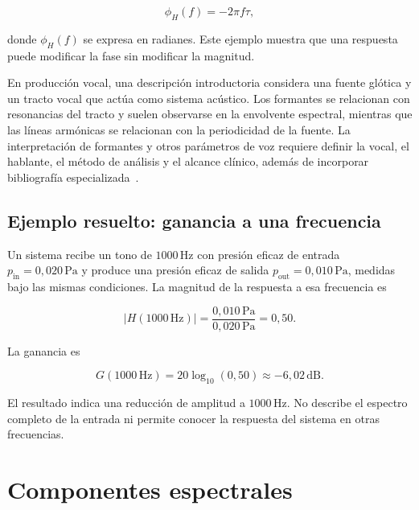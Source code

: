 \begin{equation}
    \phi_H(f)=-2\pi f\tau,
    \label{eq:u5-fase-retardo}
\end{equation}

donde \(\phi_H(f)\) se expresa en radianes. Este ejemplo muestra que una
respuesta puede modificar la fase sin modificar la magnitud.

En producción vocal, una descripción introductoria considera una fuente
glótica y un tracto vocal que actúa como sistema acústico. Los formantes se
relacionan con resonancias del tracto y suelen observarse en la envolvente
espectral, mientras que las líneas armónicas se relacionan con la periodicidad
de la fuente. La interpretación de formantes y otros parámetros de voz
requiere definir la vocal, el hablante, el método de análisis y el alcance
clínico, además de incorporar bibliografía especializada~\cite{brockmann2011}.

\subsection{Ejemplo resuelto: ganancia a una frecuencia}
\label{sec:u5-ejemplo-respuesta}

Un sistema recibe un tono de \(1000\,\text{Hz}\) con presión eficaz de entrada
\(p_\mathrm{in}=0{,}020\,\text{Pa}\) y produce una presión eficaz de salida
\(p_\mathrm{out}=0{,}010\,\text{Pa}\), medidas bajo las mismas condiciones.
La magnitud de la respuesta a esa frecuencia es

\[
    \lvert H(1000\,\text{Hz})\rvert
    =\frac{0{,}010\,\text{Pa}}{0{,}020\,\text{Pa}}
    =0{,}50.
\]

La ganancia es

\[
    G(1000\,\text{Hz})
    =20\log_{10}(0{,}50)
    \approx-6{,}02\,\text{dB}.
\]

El resultado indica una reducción de amplitud a \(1000\,\text{Hz}\). No
describe el espectro completo de la entrada ni permite conocer la respuesta
del sistema en otras frecuencias.

\section{Componentes espectrales}
\label{sec:u5-componentes}

